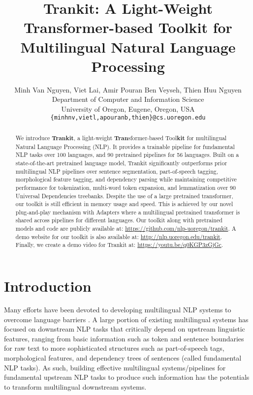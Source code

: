 \documentclass[11pt,a4paper]{article}
\title{Trankit: A Light-Weight Transformer-based Toolkit for Multilingual Natural Language Processing}
\author{Minh Van Nguyen, Viet Lai, Amir Pouran Ben Veyseh, Thien Huu Nguyen\\
  Department of Computer and Information Science \\
  University of Oregon, Eugene, Oregon, USA \\
  \texttt{\{minhnv,vietl,apouranb,thien\}@cs.uoregon.edu}}
\date{}
\begin{document}
\maketitle
\begin{abstract}
We introduce \textbf{Trankit}, a light-weight \textbf{Tran}sformer-based Tool\textbf{kit} for multilingual Natural Language Processing (NLP). It provides a trainable pipeline for fundamental NLP tasks over 100 languages, and 90 pretrained pipelines for 56 languages. Built on a state-of-the-art pretrained language model, Trankit significantly outperforms prior multilingual NLP pipelines over sentence segmentation, part-of-speech tagging, morphological feature tagging, and dependency parsing while maintaining competitive performance for tokenization, multi-word token expansion, and lemmatization over 90 Universal Dependencies treebanks. Despite the use of a large pretrained transformer, our toolkit is still efficient in memory usage and speed. This is achieved by our novel plug-and-play mechanism with Adapters where a multilingual pretrained transformer is shared across pipelines for different languages. Our toolkit along with pretrained models and code are publicly available at: \url{https://github.com/nlp-uoregon/trankit}. A demo website for our toolkit is also available at: \url{http://nlp.uoregon.edu/trankit}. Finally, we create a demo video for Trankit at: \url{https://youtu.be/q0KGP3zGjGc}.
\end{abstract}

\section{Introduction}


Many efforts have been devoted to developing multilingual NLP systems to overcome language barriers \citep{aharoni-etal-2019-massively,liu-etal-2019-neural-cross,taghizadeh2020cross,zhu2020cross,kanayama-iwamoto-2020-universal,Nguyen:21improving}. A large portion of existing multilingual systems has focused on downstream NLP tasks that critically depend on upstream linguistic features, ranging from basic information such as token and sentence boundaries for raw text to more sophisticated structures such as part-of-speech tags, morphological features, and dependency trees of sentences (called fundamental NLP tasks). As such, building effective multilingual systems/pipelines for fundamental upstream NLP tasks to produce such information has the potentials to transform multilingual downstream systems.
\end{document}
